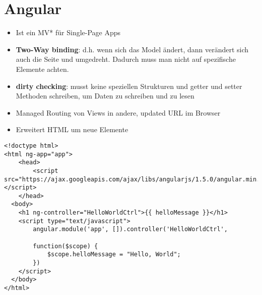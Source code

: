 \def\home{../../styles}

















\usepackage[strings]{underscore} %





\section{Angular}
\begin{itemize}
  \item Ist ein MV* für Single-Page Apps
  \item \textbf{Two-Way binding}: d.h. wenn sich das Model ändert, dann verändert sich auch die Seite und umgedreht. Dadurch muss man nicht auf spezifische Elemente achten.
  \item \textbf{dirty checking}: musst keine speziellen Strukturen und getter und setter Methoden schreiben, um Daten zu schreiben und zu lesen
  \item Managed Routing von Views in andere, updated URL im Browser
  \item Erweitert HTML um neue Elemente
\end{itemize}

\begin{verbatim}
<!doctype html>
<html ng-app="app">
    <head>
        <script src="https://ajax.googleapis.com/ajax/libs/angularjs/1.5.0/angular.min.js"></script>
    </head>
  <body>
    <h1 ng-controller="HelloWorldCtrl">{{ helloMessage }}</h1>
    <script type="text/javascript">
        angular.module('app', []).controller('HelloWorldCtrl',

        function($scope) {
            $scope.helloMessage = "Hello, World";
        })
    </script>
  </body>
</html>
\end{verbatim}

